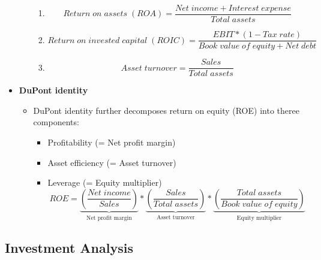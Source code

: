\documentclass[ieeetran]{article}
\begin{document}
\begin{itemize}
\begin{itemize}
\begin{enumerate}
		    \item 
		    \large
		    \begin{equation*}
		    \boxed{Return \; on \; assets \; (ROA)=\frac{Net \; income + Interest \; expense}{Total \; assets}}
		    \end{equation*}
		    \normalsize

		    \item 
		    \large
		    \begin{equation*}
		    \boxed{Return \; on \; invested \; capital \; (ROIC)=\frac{EBIT *  (1-Tax \; rate)}{Book \; value \; of \; equity + Net \; debt}}
		    \end{equation*}
		    \normalsize		    

		    \item 
		    \large
		    \begin{equation*}
		    \boxed{Asset \; turnover = \frac{Sales}{Total \; assets}}
		    \end{equation*}
		    \normalsize
		  \end{enumerate}
	\end{itemize}
\item \textbf{DuPont identity}
	\begin{itemize}
	  \item DuPont identity further decomposes return on equity (ROE) into theree components:
		  \begin{itemize}
		    \item Profitability (= Net profit margin)
	            \item Asset efficiency (= Asset turnover)
		    \item Leverage (= Equity multiplier)
			    \large
			    \begin{equation*}
				    \boxed{ROE = \underbrace{(\frac{Net \; income}{Sales})}_\text{Net profit margin} * \underbrace{(\frac{Sales}{Total \; assets})}_\text{Asset turnover} * \underbrace{(\frac{Total \; assets}{Book \; value \; of \; equity})}_\text{Equity multiplier}}
			    \end{equation*}
			    \normalsize
			    
		  \end{itemize}
	\end{itemize}
\end{itemize}
	
\subsection{Investment Analysis} %
\label{sub:investment_analysis}
\end{document}
